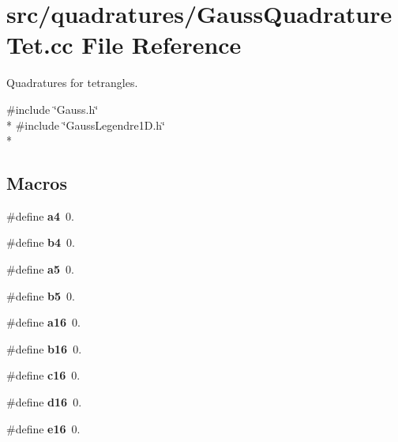 \section{src/quadratures/\-Gauss\-Quadrature\-Tet.cc File Reference}
\label{GaussQuadratureTet_8cc}


Quadratures for tetrangles.  


{\ttfamily \#include \char`\"{}Gauss.\-h\char`\"{}}\\*
{\ttfamily \#include \char`\"{}Gauss\-Legendre1\-D.\-h\char`\"{}}\\*
\subsection*{Macros}
\begin{DoxyCompactItemize}
\item 
\#define {\bfseries a4}~0.\label{GaussQuadratureTet_8cc_a2b8a642c7d03d9500f5ebb221499ce79}

\item 
\#define {\bfseries b4}~0.\label{GaussQuadratureTet_8cc_a0ab0d6238080caa43c7e61efd7918d8c}

\item 
\#define {\bfseries a5}~0.\label{GaussQuadratureTet_8cc_a811a6ac39c7ac08798fc3912b2ba860c}

\item 
\#define {\bfseries b5}~0.\label{GaussQuadratureTet_8cc_a3a6038d28bd7d0645aa5fbe68cf1f3aa}

\item 
\#define {\bfseries a16}~0.\label{GaussQuadratureTet_8cc_a79ec74963df5f88120fad83d8651a721}

\item 
\#define {\bfseries b16}~0.\label{GaussQuadratureTet_8cc_a3f9c87414a982eab10add944eebfa6cf}

\item 
\#define {\bfseries c16}~0.\label{GaussQuadratureTet_8cc_a9bff965f9bd583a7f625031196585144}

\item 
\#define {\bfseries d16}~0.\label{GaussQuadratureTet_8cc_af1edd99b81fcdfdbf62effbe16e118f0}

\item 
\#define {\bfseries e16}~0.\label{GaussQuadratureTet_8cc_a0843ae2199a53f6e3dcde8afc6838284}


\end{DoxyCompactItemize}
